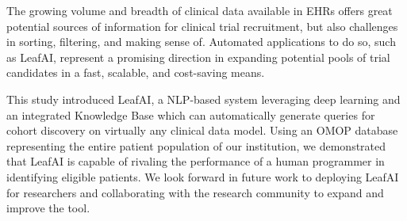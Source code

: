 \documentclass[../main.tex]{subfiles}
\begin{document}
The growing volume and breadth of clinical data available in EHRs offers great potential sources of information for clinical trial recruitment, but also challenges in sorting, filtering, and making sense of. Automated applications to do so, such as LeafAI, represent a promising direction in expanding potential pools of trial candidates in a fast, scalable, and cost-saving means.

This study introduced LeafAI, a NLP-based system leveraging deep learning and an integrated Knowledge Base which can automatically generate queries for cohort discovery on virtually any clinical data model. Using an OMOP database representing the entire patient population of our institution, we demonstrated that LeafAI is capable of rivaling the performance of a human programmer in identifying eligible patients. We look forward in future work to deploying LeafAI for researchers and collaborating with the research community to expand and improve the tool.
\end{document}
